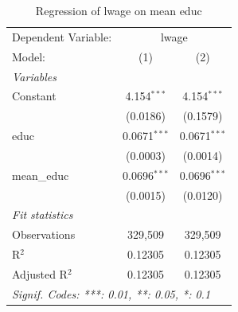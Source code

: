 
\begin{table}[htbp]
   \centering
   \begin{tabular}{lcc}
      \tabularnewline \midrule \midrule
      Dependent Variable: & \multicolumn{2}{c}{lwage}\\
      Model:         & (1)            & (2)\\  
      \midrule
      \emph{Variables}\\
      Constant       & 4.154$^{***}$  & 4.154$^{***}$\\   
      & (0.0186)       & (0.1579)\\   
      educ           & 0.0671$^{***}$ & 0.0671$^{***}$\\   
      & (0.0003)       & (0.0014)\\   
      mean\_educ     & 0.0696$^{***}$ & 0.0696$^{***}$\\   
      & (0.0015)       & (0.0120)\\   
      \midrule
      \emph{Fit statistics}\\
      Observations   & 329,509        & 329,509\\  
      R$^2$          & 0.12305        & 0.12305\\  
      Adjusted R$^2$ & 0.12305        & 0.12305\\  
      \midrule \midrule
      \multicolumn{3}{l}{\emph{Signif. Codes: ***: 0.01, **: 0.05, *: 0.1}}\\
   \end{tabular}
   \caption{\label{tab:regression_problem_1_e} Regression of lwage on mean educ}
\end{table}


